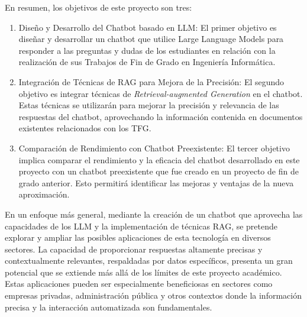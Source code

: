 En resumen, los objetivos de este proyecto son tres:
\begin{enumerate}
    \item Diseño y Desarrollo del Chatbot basado en LLM: El primer objetivo es diseñar y desarrollar un chatbot que utilice Large Language Models para responder a las preguntas y dudas de los estudiantes en relación con la realización de sus Trabajos de Fin de Grado en Ingeniería Informática.
    
    \item Integración de Técnicas de RAG para Mejora de la Precisión: El segundo objetivo es integrar técnicas de \textit{Retrieval-augmented Generation} en el chatbot. Estas técnicas se utilizarán para mejorar la precisión y relevancia de las respuestas del chatbot, aprovechando la información contenida en documentos existentes relacionados con los TFG.

    \item Comparación de Rendimiento con Chatbot Preexistente: El tercer objetivo implica comparar el rendimiento y la eficacia del chatbot desarrollado en este proyecto con un chatbot preexistente que fue creado en un proyecto de fin de grado anterior. Esto permitirá identificar las mejoras y ventajas de la nueva aproximación.
    
\end{enumerate}

En un enfoque más general, mediante la creación de un chatbot que aprovecha las capacidades de los LLM y la implementación de técnicas RAG, se pretende explorar y ampliar las posibles aplicaciones de esta tecnología en diversos sectores. La capacidad de proporcionar respuestas altamente precisas y contextualmente relevantes, respaldadas por datos específicos, presenta un gran potencial que se extiende más allá de los límites de este proyecto académico. Estas aplicaciones pueden ser especialmente beneficiosas en sectores como empresas privadas, administración pública y otros contextos donde la información precisa y la interacción automatizada son fundamentales.





